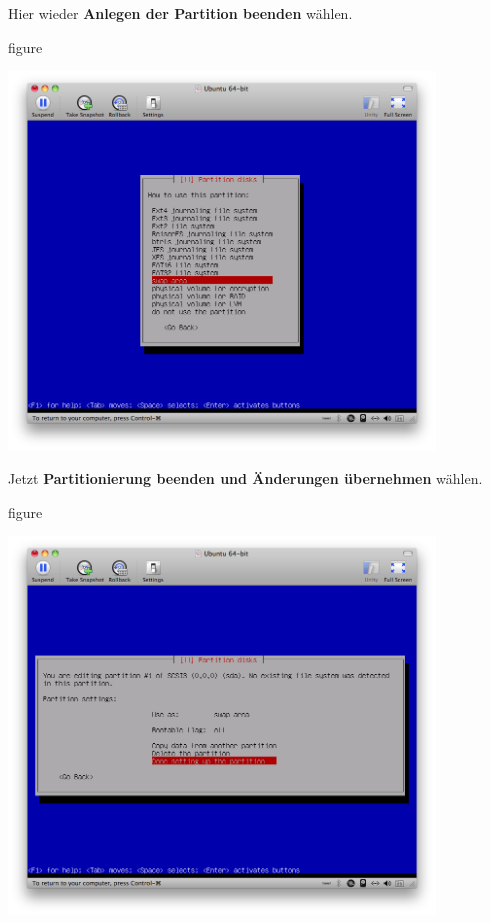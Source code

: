 Hier wieder \textbf{Anlegen der Partition beenden} wählen.

\begin{nofloat}{figure}
\begin{center}
\includegraphics[width=0.85\textwidth]{screenshots/19_ubuntu_install.png}
\end{center}
\end{nofloat}

\pagebreak
Jetzt \textbf{Partitionierung beenden und Änderungen übernehmen} wählen.

\begin{nofloat}{figure}
\begin{center}
\includegraphics[width=0.85\textwidth]{screenshots/20_ubuntu_install.png}
\end{center}
\end{nofloat}

